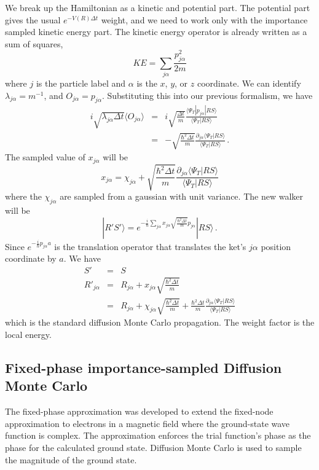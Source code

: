  We break up the Hamiltonian as a kinetic and potential part. The potential
 part gives the usual $e^{-V(R) \Delta t}$ weight, and we need to work only
 with the importance sampled kinetic energy part.
 The kinetic energy operator is already written as a sum of squares,
 \begin{equation}
 KE = \sum_{j\alpha} \frac{p_{j\alpha}^2}{2m}
 \end{equation}
 where $j$ is the particle label and $\alpha$ is the $x$, $y$, or $z$ coordinate.
 We can identify $\lambda_{j\alpha} = m^{-1}$, and $O_{j\alpha} = p_{j\alpha}$.
 Substituting this into our previous formalism, we have
 \begin{eqnarray}
 i \sqrt{\lambda_{j\alpha} \Delta t}\langle O_{j\alpha} \rangle
 &=& i \sqrt{\frac{\Delta t}{m}} \frac{\langle \Psi_T |p_{j\alpha}|RS\rangle}
 {\langle \Psi_T |RS\rangle} 
 \nonumber\\
 &=& -\sqrt{\frac{\hbar^2 \Delta t}{m}}
 \frac{\partial_{j\alpha} \langle \Psi_T |RS\rangle}
 {\langle \Psi_T |RS\rangle}  \,.
 \end{eqnarray}
 The sampled value of $x_{j\alpha}$ will be
 \begin{equation}
 x_{j\alpha} = \chi_{j\alpha} + 
 \sqrt{\frac{\hbar^2 \Delta t}{m}}
 \frac{\partial_{j\alpha} \langle \Psi_T |RS\rangle}
 {\langle \Psi_T |RS\rangle}
 \end{equation}
 where the $\chi_{j\alpha}$ are sampled from a gaussian with unit variance.
 The new walker will be
 \begin{equation}
 |R'S'\rangle = e^{-\frac{i}{\hbar} \sum_{j\alpha} x_{j\alpha}
 	\sqrt{\frac{\hbar^2 \Delta t}{m}} p_{j\alpha} }|R S\rangle \,.
 \end{equation}
 Since
 $e^{-\frac{i}{\hbar} p_{j\alpha} a}$ is the translation operator that
 translates the ket's $j\alpha$ position coordinate by $a$.
 We have
 \begin{eqnarray}
 S' &=& S
 \nonumber\\
 R'_{j\alpha} &=& R_{j\alpha} + x_{j\alpha}\sqrt{\frac{\hbar^2 \Delta t}{m}}
 \nonumber\\
 &=& R_{j\alpha}+ \chi_{j\alpha} \sqrt{\frac{\hbar^2 \Delta t}{m}}
 +
 \frac{\hbar^2 \Delta t}{m}
 \frac{\partial_{j\alpha} \langle \Psi_T |RS\rangle}
 {\langle \Psi_T |RS\rangle}
 \end{eqnarray}
 which is the standard diffusion Monte Carlo propagation. The weight factor
 is the local energy.
 
 \subsection{Fixed-phase importance-sampled Diffusion Monte Carlo}
 \label{sec:fixedph}
 The fixed-phase approximation\cite{ortiz1993} was developed to extend the
 fixed-node approximation to electrons in a magnetic field where the
 ground-state wave function is complex. The approximation enforces the
 trial function's phase as the phase for the calculated ground state.
 Diffusion Monte Carlo is used to sample the magnitude of the ground
 state.
 
